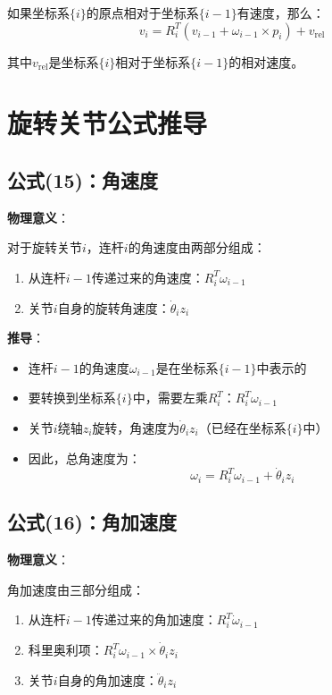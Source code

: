 \documentclass[12pt,a4paper]{article}
\begin{document}
如果坐标系$\{i\}$的原点相对于坐标系$\{i-1\}$有速度，那么：
\begin{equation}
v_i = R_i^T (v_{i-1} + \omega_{i-1} \times p_i) + v_{\text{rel}}
\end{equation}

其中$v_{\text{rel}}$是坐标系$\{i\}$相对于坐标系$\{i-1\}$的相对速度。

\section{旋转关节公式推导}

\subsection{公式(15)：角速度}

\textbf{物理意义}：

对于旋转关节$i$，连杆$i$的角速度由两部分组成：
\begin{enumerate}
\item 从连杆$i-1$传递过来的角速度：$R_i^T \omega_{i-1}$
\item 关节$i$自身的旋转角速度：$\dot{\theta}_i z_i$
\end{enumerate}

\textbf{推导}：

\begin{itemize}
\item 连杆$i-1$的角速度$\omega_{i-1}$是在坐标系$\{i-1\}$中表示的
\item 要转换到坐标系$\{i\}$中，需要左乘$R_i^T$：$R_i^T \omega_{i-1}$
\item 关节$i$绕轴$z_i$旋转，角速度为$\dot{\theta}_i z_i$（已经在坐标系$\{i\}$中）
\item 因此，总角速度为：
\begin{equation}
\omega_i = R_i^T \omega_{i-1} + \dot{\theta}_i z_i \tag{15}
\end{equation}
\end{itemize}

\subsection{公式(16)：角加速度}

\textbf{物理意义}：

角加速度由三部分组成：
\begin{enumerate}
\item 从连杆$i-1$传递过来的角加速度：$R_i^T \dot{\omega}_{i-1}$
\item 科里奥利项：$R_i^T \omega_{i-1} \times \dot{\theta}_i z_i$
\item 关节$i$自身的角加速度：$\ddot{\theta}_i z_i$
\end{enumerate}
\end{document}
